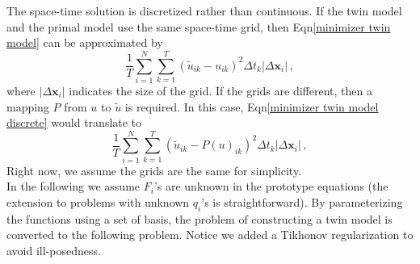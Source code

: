 \documentclass[a4paper,onecolumn]{article}
\theoremstyle{remark}
\begin{document}
\noindent The space-time solution is discretized rather than continuous. 
If the twin model and the 
primal model use the same space-time grid, then Eqn\eqref{minimizer twin model} can be
approximated by
\begin{equation}
    \frac{1}{T}
    \sum_{i=1}^{N}\sum_{k=1}^{T} \left(\tilde{u}_{ik} - u_{ik}\right)^2 \Delta t_k
    \left| \Delta \mathbf{x}_i \right|\,,
    \label{minimizer twin model discrete}
\end{equation}
where $\left| \Delta \mathbf{x}_i \right|$ indicates the size of the grid.
If the grids are different, then a mapping $P$ from $u$ to $\tilde{u}$ is required.
In this case, Eqn\eqref{minimizer twin model discrete} would translate to
\begin{equation}
    \frac{1}{T}
    \sum_{i=1}^{N}\sum_{k=1}^{T} \left(\tilde{u}_{ik} - P(u)_{ik}\right)^2 \Delta t_k
    \left| \Delta \mathbf{x}_i \right|\,,
    \label{minimizer twin model discrete mapping}
\end{equation}
Right now, we assume the grids are the same for simplicity.\\

\noindent 
In the following we assume $F_i$'s are unknown in the prototype equations
(the extension to problems with unknown $q_i$'s
is straightforward). By parameterizing the functions using a set of basis,
the problem of constructing a twin model
is converted to the following problem. Notice we added a Tikhonov regularization
to avoid ill-posedness. \\

\\
\end{document}
